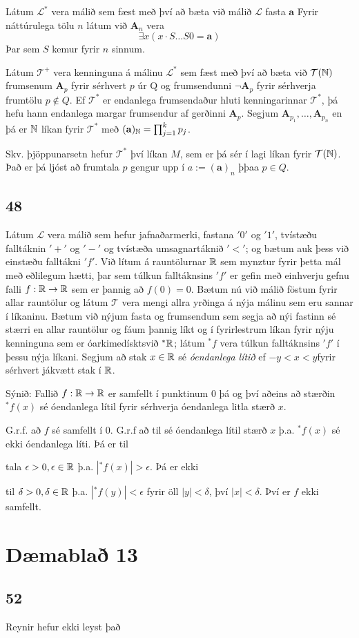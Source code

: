 \documentclass[12pt]{book}
\newcommand{\cT}{\mathcal{T}}
\newcommand{\cL}{\mathcal{L}}
\newcommand{\bA}{\mathbf{A}}
\newcommand{\ba}{\mathbf{a}}
\begin{document}
\begin{lausn}[Tandri]
  Látum $\cL^*$ vera málið sem fæst með því að bæta við málið
  $\cL$ fasta $\ba$ Fyrir náttúrulega tölu $n$ látum við
  $\bA_n$ vera 
  \[ \exists x ( x \cdot S \dotsc S 0= \ba) \]
  Þar sem $S$ kemur fyrir $n$ sinnum.

  Látum $\cT^+$ vera kenninguna á málinu $\cL^*$ sem fæst með því að bæta við
  $\cT(\N)$ frumsenum $\bA_p$ fyrir sérhvert $p$ úr Q og frumsendunni
  $\lnot \bA_p$ fyrir sérhverja frumtölu $p \not \in Q$. 
  Ef $\cT^*$ er endanlega frumsendaður hluti kenningarinnar $\cT^*$,
  þá hefu hann endanlega margar frumsendur af gerðinni $\bA_p$.
  Segjum
  $\bA_{p_1}, \dotsc, \bA_{p_n}$ en þá er $\mathbb{N}$ líkan fyrir
  $\cT^*$ með $(\ba)_{\N} = \prod_{j=1}^k p_j$.

  Skv. þjöppunarsetn hefur $\cT^*$ því líkan $M$, sem er þá sér í lagi líkan
  fyrir $\cT(\N)$. Það er þá ljóst að frumtala $p$ gengur upp í $ a := (\ba)_n$
  þþaa $p \in Q$.
\end{lausn}




\section{48}

\begin{daemi}
  Látum $\cL$ vera málið sem hefur jafnaðarmerki, fastana $'0'$ og $'1'$,
  tvístæðu falltáknin $'+'$ og $'-'$ og tvístæða umsagnartáknið $'<'$;
  og bætum auk þess við einstæðu falltákni $'f'$. Við lítum á rauntölurnar $\mathbb{R}$ 
 sem mynztur fyrir þetta mál með eðlilegum hætti, þar sem túlkun falltáknsins 
 $'f'$ er gefin með einhverju gefnu falli $f:\mathbb{R} \to  \mathbb{R}$
 sem er þannig að $f(0) = 0$. Bætum nú við málið föstum fyrir allar rauntölur og látum
 $\cT$ vera mengi allra yrðinga á nýja málinu sem eru sannar 
 í líkaninu. Bætum við nýjum fasta og frumsendum sem segja að nýi fastinn sé 
 stærri en allar rauntölur og fáum þannig líkt og í fyrirlestrum líkan fyrir nýju
 kenninguna sem er óarkimedísktsvið ${}^*\mathbb{R}$; látum ${}^*f$
 vera túlkun falltáknsins $'f'$ í þessu nýja líkani. Segjum að stak $x \in \mathbb{R}$
 sé \emph{óendanlega lítið} ef $-y < x < y$fyrir sérhvert jákvætt stak í $\mathbb{R}$.

 Sýnið: Fallið $f:\mathbb{R} \to \mathbb{R}$ er samfellt í punktinum $0$ 
 þá og því aðeins að stærðin ${}^*f(x)$ sé óendanlega lítil fyrir
 sérhverja óendanlega litla stærð $x$.
\end{daemi}

\begin{lausn}[Áslaug]
G.r.f. að $f$ sé samfellt í $0$. G.r.f að til
sé óendanlega lítil stærð $x$ þ.a. ${}^*f(x)$ sé ekki óendanlega líti. Þá er til

tala $\epsilon > 0, \epsilon \in \mathbb{R}$ þ.a. $|{}^*f(x)| > \epsilon$. Þá er ekki


til $\delta > 0, \delta \in \mathbb{R}$ þ.a. $|{}^*f(y)| < \epsilon$ fyrir öll
$|y| < \delta$, því $|x| < \delta$. Því er $f$ ekki samfellt.
  
\end{lausn}

\chapter{Dæmablað 13}

\section{52}

Reynir hefur ekki leyst það
\end{document}
